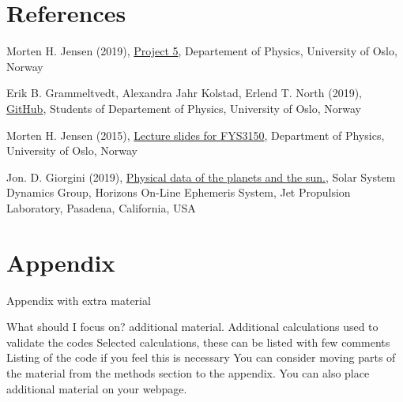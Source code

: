 \documentclass{article}
\begin{document}
\section{References} \label{sec:References}

\iffalse
What should I focus on? References.
Give always references to material you base your work on, either scientific articles/reports or books.
Refer to articles as: name(s) of author(s), journal, volume (boldfaced), page and year in parenthesis.
Refer to books as: name(s) of author(s), title of book, publisher, place and year, eventual page numbers
\fi

\begin{thebibliography}{}

Morten H. Jensen (2019), \href{https://github.com/CompPhysics/ComputationalPhysics/blob/master/doc/Projects/2019/Project5/SolarSystem/pdf/SolarSystem.pdf}{Project 5}, Departement of Physics, University of Oslo, Norway

Erik B. Grammeltvedt, Alexandra Jahr Kolstad, Erlend T. North (2019), \href{https://github.com/Erikbgram/Fys3150}{GitHub}, Students of Departement of Physics, University of Oslo, Norway

Morten H. Jensen (2015), \href{https://github.com/CompPhysics/ComputationalPhysics/blob/master/doc/Lectures/lectures2015.pdf}{Lecture slides for FYS3150}, Department of Physics, University of Oslo, Norway

Jon. D. Giorgini (2019), \href{https://ssd.jpl.nasa.gov/horizons.cgi#top}{Physical data of the planets and the sun.}, Solar System Dynamics Group, Horizons On-Line Ephemeris System, Jet Propulsion Laboratory, Pasadena, California, USA


\end{thebibliography}


\vspace{1cm}


\appendix
\section{Appendix} \label{sec:Appendix}

Appendix with extra material


What should I focus on? additional material.
Additional calculations used to validate the codes
Selected calculations, these can be listed with few comments
Listing of the code if you feel this is necessary
You can consider moving parts of the material from the methods section to the appendix. You can also place additional material on your webpage.
\end{document}
